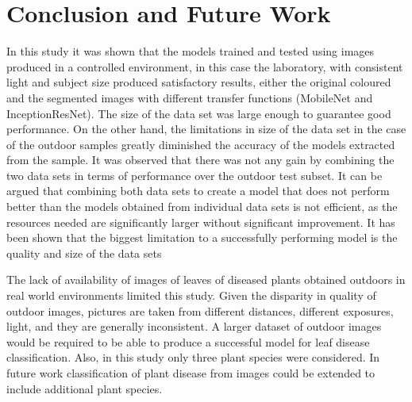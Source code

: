 \documentclass[conference]{IEEEtran}
\begin{document}
\section{Conclusion and Future Work}

In this study it was shown that the models trained and tested using images produced in a controlled environment, in this case the laboratory, with consistent light and subject size produced satisfactory results, either the original coloured and the segmented images with different transfer functions (MobileNet and InceptionResNet). The size of the data set was large enough to guarantee good performance. On the other hand, the limitations in size of the data set in the case of the outdoor samples greatly diminished the accuracy of the models extracted from the sample. It was observed that there was not any gain by combining the two data sets in terms of performance over the outdoor test subset. It can be argued that combining both data sets to create a model that does not perform better than the models obtained from individual data sets is not efficient, as the resources needed are significantly larger without significant improvement. It has been shown that the biggest limitation to a successfully performing model is the quality and size of the data sets \

The lack of availability of images of leaves of diseased plants obtained outdoors in real world environments limited this study.  Given the disparity in quality of outdoor images, pictures are taken from different distances, different exposures, light, and they are generally inconsistent. A larger dataset of outdoor images would be required to be able to produce a successful model for leaf disease classification. Also, in this study only three plant species were considered. In future work classification of plant disease from images could be extended to include additional plant species.\
\end{document}
